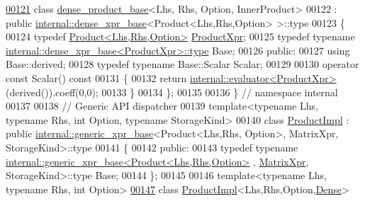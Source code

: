 \begin{DoxyCode}
\hyperlink{class_eigen_1_1internal_1_1dense__product__base_3_01_lhs_00_01_rhs_00_01_option_00_01_inner_product_01_4}{00121} \textcolor{keyword}{class }\hyperlink{class_eigen_1_1internal_1_1dense__product__base}{dense\_product\_base}<Lhs, Rhs, Option, InnerProduct>
00122  : \textcolor{keyword}{public} \hyperlink{struct_eigen_1_1internal_1_1dense__xpr__base}{internal::dense\_xpr\_base}<Product<Lhs,Rhs,Option> >::type
00123 \{
00124   \textcolor{keyword}{typedef} \hyperlink{group___core___module_class_eigen_1_1_product}{Product<Lhs,Rhs,Option>} \hyperlink{group___core___module_class_eigen_1_1_product}{ProductXpr};
00125   \textcolor{keyword}{typedef} \textcolor{keyword}{typename} \hyperlink{struct_eigen_1_1internal_1_1dense__xpr__base}{internal::dense\_xpr\_base<ProductXpr>::type} 
      Base;
00126 \textcolor{keyword}{public}:
00127   \textcolor{keyword}{using} Base::derived;
00128   \textcolor{keyword}{typedef} \textcolor{keyword}{typename} Base::Scalar Scalar;
00129   
00130   \textcolor{keyword}{operator} \textcolor{keyword}{const} Scalar()\textcolor{keyword}{ const}
00131 \textcolor{keyword}{  }\{
00132     \textcolor{keywordflow}{return} \hyperlink{struct_eigen_1_1internal_1_1evaluator}{internal::evaluator<ProductXpr>}(derived()).coeff(0,0);
00133   \}
00134 \};
00135 
00136 \} \textcolor{comment}{// namespace internal}
00137 
00138 \textcolor{comment}{// Generic API dispatcher}
00139 \textcolor{keyword}{template}<\textcolor{keyword}{typename} Lhs, \textcolor{keyword}{typename} Rhs, \textcolor{keywordtype}{int} Option, \textcolor{keyword}{typename} StorageKind>
00140 \textcolor{keyword}{class }\hyperlink{class_eigen_1_1_product_impl}{ProductImpl} : \textcolor{keyword}{public} \hyperlink{struct_eigen_1_1internal_1_1generic__xpr__base}{internal::generic\_xpr\_base}<Product<Lhs,Rhs,
      Option>, MatrixXpr, StorageKind>::type
00141 \{
00142   \textcolor{keyword}{public}:
00143     \textcolor{keyword}{typedef} \textcolor{keyword}{typename} \hyperlink{struct_eigen_1_1internal_1_1generic__xpr__base}{internal::generic\_xpr\_base<Product<Lhs,Rhs,Option>}
      , \hyperlink{struct_eigen_1_1_matrix_xpr}{MatrixXpr}, StorageKind>::type Base;
00144 \};
00145 
00146 \textcolor{keyword}{template}<\textcolor{keyword}{typename} Lhs, \textcolor{keyword}{typename} Rhs, \textcolor{keywordtype}{int} Option>
\hyperlink{class_eigen_1_1_product_impl_3_01_lhs_00_01_rhs_00_01_option_00_01_dense_01_4}{00147} \textcolor{keyword}{class }\hyperlink{class_eigen_1_1_product_impl}{ProductImpl}<Lhs,Rhs,Option,\hyperlink{struct_eigen_1_1_dense}{Dense}>

\end{DoxyCode}

